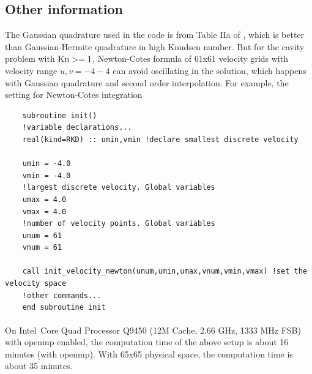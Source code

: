 \documentclass[a4paper]{book}
\begin{document}
\subsection{Other information}
The Gaussian quadrature used in the code is from Table IIa of \cite{Shizgal1981}, which is better than Gaussian-Hermite quadrature in high Knudsen number. But for the cavity problem with ${\rm Kn}>=1$, Newton-Cotes formula of 61x61 velocity grids with velocity range $u,v=-4-4$ can avoid oscillating in the solution, which happens with Gaussian quadrature and second order interpolation. For example, the setting for Newton-Cotes integration

\begin{verbatim}
    subroutine init()
    !variable declarations...
    real(kind=RKD) :: umin,vmin !declare smallest discrete velocity

    umin = -4.0
    vmin = -4.0
    !largest discrete velocity. Global variables
    umax = 4.0
    vmax = 4.0
    !number of velocity points. Global variables
    unum = 61
    vnum = 61

    call init_velocity_newton(unum,umin,umax,vnum,vmin,vmax) !set the velocity space
    !other commands...
    end subroutine init
\end{verbatim}

On Intel\textregistered\ Core\textsuperscript{\texttrademark} Quad Processor Q9450 (12M Cache, 2.66 GHz, 1333 MHz FSB) with openmp enabled, the computation time of the above setup is about 16 minutes (with openmp). With 65x65 physical space, the computation time is about 35 minutes.

\backmatter

\end{document}
